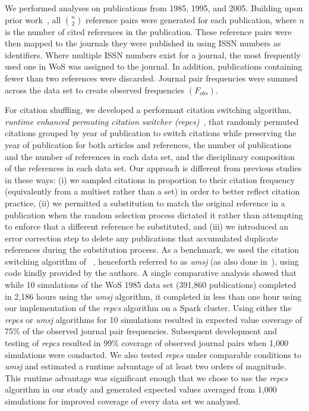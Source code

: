 \documentclass[NETN]{stjour}
\begin{document}
We performed analyses on publications from 1985, 1995, and 2005. Building upon prior work~\citep{uzzi_atypical_2013}, all ${n \choose 2}$ reference pairs were generated for each publication, where $n$ is the number of cited references in the publication. These reference pairs were then mapped to the journals they were published in using ISSN numbers as identifiers. Where multiple ISSN numbers exist for a journal, the most frequently used one in WoS was assigned to the journal. In addition, publications containing fewer than two references were discarded. Journal pair frequencies were summed across the data set to create observed frequencies $(F_{obs})$. 

For citation shuffling, we developed a performant citation switching algorithm, \emph{runtime enhanced permuting citation switcher (repcs)}~\citep{GithubERNIE2019}, that randomly permuted citations grouped by year of publication to switch citations while preserving the year of publication for both articles and references, the number of publications and the number of references in each data set, and the disciplinary composition of the references in each data set. Our approach is different from previous studies in these ways: (i) we sampled citations in proportion to their citation frequency (equivalently from a multiset rather than a set) in order to better reflect citation practice, 
(ii) we permitted a substitution to match the original reference in a publication when the random selection process dictated it rather than attempting to enforce that a different reference be substituted, and (iii) we introduced an error correction step to delete any publications that accumulated duplicate references during the substitution process.  As a benchmark, we used the citation switching algorithm of ~\cite{uzzi_atypical_2013}, henceforth referred to  as \emph{umsj} (as also done in~\cite{boyack_vs_uzzi_2014}), using code kindly provided by the authors. A single comparative analysis showed that while 10 simulations of the WoS 1985 data set (391,860 publications) completed in 2,186 hours using the \emph{umsj} algorithm, it completed in less than one hour using our implementation of the \emph{repcs}   algorithm on a Spark  cluster. Using either the \emph{repcs}   or \emph{umsj} algorithms for 10 simulations resulted in expected value coverage of 75\% of the observed journal pair frequencies. Subsequent development and testing of \emph{repcs} resulted in 99\% coverage of observed journal pairs when 1,000 simulations were conducted. We also tested \emph{repcs}  under comparable conditions to \emph{umsj} and estimated a runtime advantage of at least two orders of magnitude. This runtime advantage was significant enough that we chose to use the \emph{repcs}   algorithm in our study and generated expected values averaged from 1,000 simulations for improved coverage of every data set we analyzed.
\end{document}
